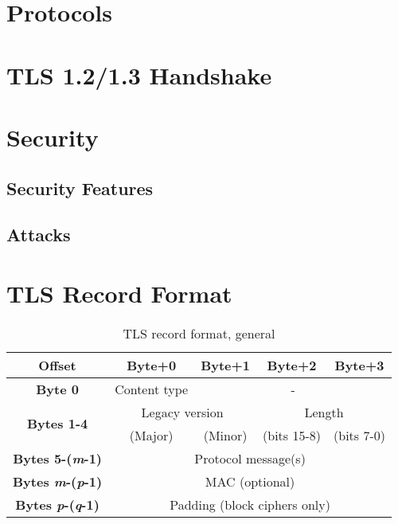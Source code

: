 \documentclass[11pt]{scrartcl} %
\begin{document}
\section{Protocols}




\section{TLS 1.2/1.3 Handshake}
\label{sec:tls_handshake}


\section{Security}

\subsection{Security Features}

\subsection{Attacks}

\section{TLS Record Format}


\begin{table}[htbp]
	\centering
	\caption{TLS record format, general}
	\begin{tabular}{|c|c|c|c|c|}
	\hline
	\textbf{Offset} & \textbf{Byte+0} & \textbf{Byte+1} & \textbf{Byte+2} & \textbf{Byte+3} \\ \hline
	\textbf{Byte 0} & Content type & \multicolumn{3}{c|}{-} \\ \hline
	\multirow{2}{*}{\textbf{Bytes 1-4}} & \multicolumn{2}{c|}{Legacy version} & \multicolumn{2}{c|}{Length} \\ \cline{2-5} 
	 & (Major) & (Minor) & (bits 15-8) & (bits 7-0) \\ \hline
	\textbf{Bytes 5-(\textit{m}-1)} & \multicolumn{4}{c|}{Protocol message(s)} \\ \hline
	\textbf{Bytes \textit{m}-(\textit{p}-1)} & \multicolumn{4}{c|}{MAC (optional)} \\ \hline
	\textbf{Bytes \textit{p}-(\textit{q}-1)} & \multicolumn{4}{c|}{Padding (block ciphers only)} \\ \hline
	\end{tabular}
\end{table}
	
	
	
\end{document}
